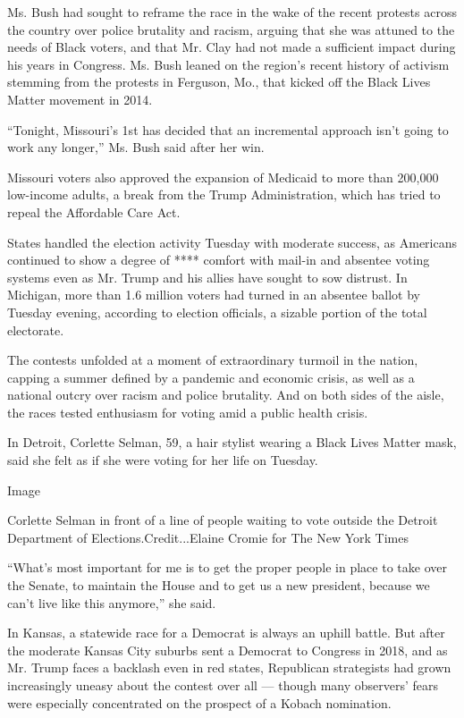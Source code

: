 Ms. Bush had sought to reframe the race in the wake of the recent
protests across the country over police brutality and racism, arguing
that she was attuned to the needs of Black voters, and that Mr. Clay had
not made a sufficient impact during his years in Congress. Ms. Bush
leaned on the region's recent history of activism stemming from the
protests in Ferguson, Mo., that kicked off the Black Lives Matter
movement in 2014.

``Tonight, Missouri's 1st has decided that an incremental approach isn't
going to work any longer,'' Ms. Bush said after her win.

Missouri voters also approved the expansion of Medicaid to more than
200,000 low-income adults, a break from the Trump Administration, which
has tried to repeal the Affordable Care Act.

States handled the election activity Tuesday with moderate success, as
Americans continued to show a degree of **** comfort with mail-in and
absentee voting systems even as Mr. Trump and his allies have sought to
sow distrust. In Michigan, more than 1.6 million voters had turned in an
absentee ballot by Tuesday evening, according to election officials, a
sizable portion of the total electorate.

The contests unfolded at a moment of extraordinary turmoil in the
nation, capping a summer defined by a pandemic and economic crisis, as
well as a national outcry over racism and police brutality. And on both
sides of the aisle, the races tested enthusiasm for voting amid a public
health crisis.

In Detroit, Corlette Selman, 59, a hair stylist wearing a Black Lives
Matter mask, said she felt as if she were voting for her life on
Tuesday.

Image

Corlette Selman in front of a line of people waiting to vote outside the
Detroit Department of Elections.Credit...Elaine Cromie for The New York
Times

``What's most important for me is to get the proper people in place to
take over the Senate, to maintain the House and to get us a new
president, because we can't live like this anymore,'' she said.

In Kansas, a statewide race for a Democrat is always an uphill battle.
But after the moderate Kansas City suburbs sent a Democrat to Congress
in 2018, and as Mr. Trump faces a backlash even in red states,
Republican strategists had grown increasingly uneasy about the contest
over all --- though many observers' fears were especially concentrated
on the prospect of a Kobach nomination.


